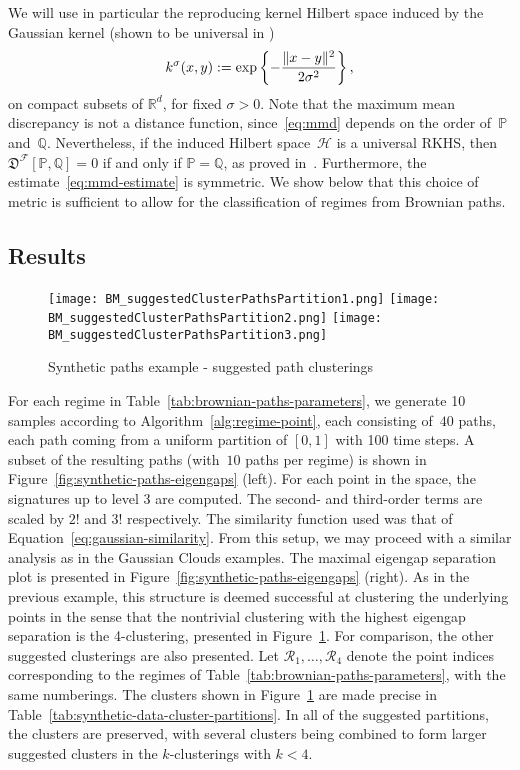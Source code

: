\documentclass{amsart}[11pt]
\numberwithin{equation}{section}
\theoremstyle{definition}
\newcommand{\MMD}{\mathfrak{D}}
\newcommand{\RR}{\mathbb{R}}
\newcommand{\PP}{\mathbb{P}}
\newcommand{\QQ}{\mathbb{Q}}
\newcommand{\Hh}{\mathcal{H}}
\newcommand{\Ff}{\mathcal{F}}
\DeclarePairedDelimiter{\norm}{\lVert}{\rVert}
\begin{document}
We will use in particular the reproducing kernel Hilbert space induced by the Gaussian kernel (shown to be universal in \cite{Steinwart01})
\begin{equation}\label{eq:gaussian-kernel}
    k^{\sigma}(x, y) := \exp \left\{-\frac{\norm{x-y}^2}{2\sigma^2} \right\},
\end{equation}
on compact subsets of $\RR^d$, for fixed $\sigma>0$.
Note that the maximum mean discrepancy is not a distance function,
since~\eqref{eq:mmd} depends on the order of~$\PP$ and~$\QQ$.
Nevertheless, if the induced Hilbert space~$\Hh$ is a universal RKHS,
then $\MMD^{\Ff}[\PP, \QQ] = 0$ if and only if $\PP= \QQ$,
as proved in~\cite{Gretton08}.
Furthermore, the estimate~\eqref{eq:mmd-estimate} is symmetric.
We show below that this choice of metric is sufficient to allow for the classification of regimes from Brownian paths.

\subsection{Results}

\begin{figure}[ht]
    \centering
        \texttt{[image: BM\_suggestedClusterPathsPartition1.png]}
        \texttt{[image: BM\_suggestedClusterPathsPartition2.png]}
        \texttt{[image: BM\_suggestedClusterPathsPartition3.png]}
    \caption{Synthetic paths example - suggested path clusterings}
    \label{fig:synthetic-paths-best-clusterings}
\end{figure}

For each regime in Table~\ref{tab:brownian-paths-parameters},
we generate 10 samples according to Algorithm~\ref{alg:regime-point},
each consisting of~$40$ paths, each path coming from a uniform partition of $[0,1]$ with 100 time steps.
A subset of the resulting paths (with~$10$ paths per regime) is shown
in Figure~\ref{fig:synthetic-paths-eigengaps} (left).
For each point in the space, the signatures up to level 3 are computed. The second- and third-order terms are scaled by $2!$ and $3!$ respectively.
The similarity function used was that of Equation~\eqref{eq:gaussian-similarity}.
From this setup, we may proceed with a similar analysis as in the Gaussian Clouds examples.
The maximal eigengap separation plot is presented in Figure~\ref{fig:synthetic-paths-eigengaps} (right).
As in the previous example, this structure is deemed successful at clustering the underlying points in the sense that the nontrivial clustering with the highest eigengap separation is the 4-clustering, presented in Figure~\ref{fig:synthetic-paths-best-clusterings}.
For comparison, the other suggested clusterings are also presented.
Let $\mathcal{R}_1, \ldots, \mathcal{R}_4$ denote the point indices corresponding to the regimes of Table~\ref{tab:brownian-paths-parameters}, with the same numberings. The clusters shown in Figure~\ref{fig:synthetic-paths-best-clusterings} are made precise in Table~\ref{tab:synthetic-data-cluster-partitions}. In all of the suggested partitions, the clusters are preserved, with several clusters being combined to form larger suggested clusters in the $k$-clusterings with $k < 4$.
\end{document}
